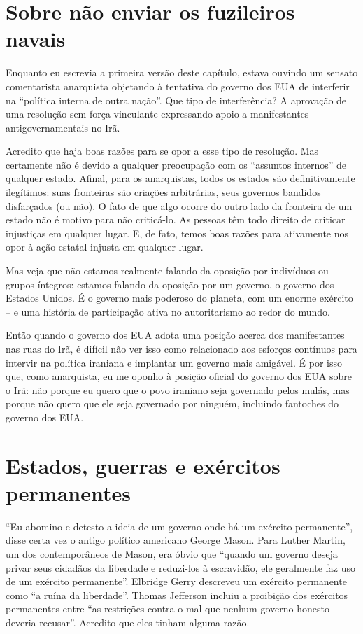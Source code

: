 \section{Sobre não enviar os fuzileiros navais}

Enquanto eu escrevia a primeira versão deste capítulo, estava ouvindo um sensato comentarista anarquista objetando à tentativa do governo dos EUA de interferir na ``política interna de outra nação''. Que tipo de interferência? A aprovação de uma resolução sem força vinculante expressando apoio a manifestantes antigovernamentais no Irã.

Acredito que haja boas razões para se opor a esse tipo de resolução. Mas certamente não é devido a qualquer preocupação com os ``assuntos internos'' de qualquer estado. Afinal, para os anarquistas, todos os estados são definitivamente ilegítimos: suas fronteiras são criações arbitrárias, seus governos bandidos disfarçados (ou não). O fato de que algo ocorre do outro lado da fronteira de um estado não é motivo para não criticá-lo. As pessoas têm todo direito de criticar injustiças em qualquer lugar. E, de fato, temos boas razões para ativamente nos opor à ação estatal injusta em qualquer lugar.

Mas veja que não estamos realmente falando da oposição por indivíduos ou grupos íntegros: estamos falando da oposição por um governo, o governo dos Estados Unidos. É o governo mais poderoso do planeta, com um enorme exército -- e uma história de participação ativa no autoritarismo ao redor do mundo. 

Então quando o governo dos EUA adota uma posição acerca dos manifestantes nas ruas do Irã, é difícil não ver isso como relacionado aos esforços contínuos para intervir na política iraniana e implantar um governo mais amigável. É por isso que, como anarquista, eu me oponho à posição oficial do governo dos EUA sobre o Irã: não porque eu quero que o povo iraniano seja governado pelos mulás, mas porque não quero que ele seja governado por ninguém, incluindo fantoches do governo dos EUA.

\section{Estados, guerras e exércitos permanentes}

``Eu abomino e detesto a ideia de um governo onde há um exército permanente'', disse certa vez o antigo político americano George Mason. Para Luther Martin, um dos contemporâneos de Mason, era óbvio que ``quando um governo deseja privar seus cidadãos da liberdade e reduzi-los à escravidão, ele geralmente faz uso de um exército permanente''. Elbridge Gerry descreveu um exército permanente como ``a ruína da liberdade''. Thomas Jefferson incluiu a proibição dos exércitos permanentes entre ``as restrições contra o mal que nenhum governo honesto deveria recusar''. Acredito que eles tinham alguma razão.

